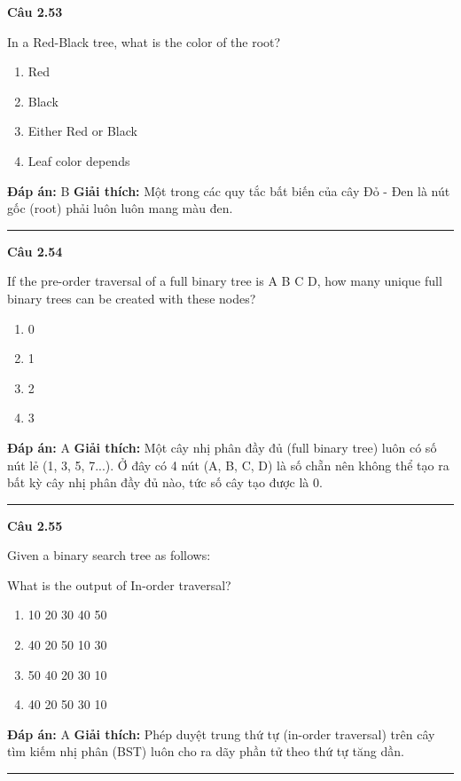 \documentclass[11pt,a4paper]{article}
\newenvironment{question}[1]{%
  \par\vspace{1em}\noindent\textbf{\large Câu #1}\par\vspace{0.4em}
}{%
  \par\vspace{1em}\hrule\vspace{0.6em}
}
\newenvironment{choices}{%
  \begin{enumerate}[label=\textbf{\Alph*.},leftmargin=2.2em,itemsep=2pt,topsep=3pt]
}{%
  \end{enumerate}
}
\newcommand{\choice}{\item}
\begin{document}
\begin{question}{2.53}
In a Red-Black tree, what is the color of the root?
\begin{choices}
\choice Red
\choice Black
\choice Either Red or Black
\choice Leaf color depends
\end{choices}
\textbf{Đáp án:} B
\textbf{Giải thích:} Một trong các quy tắc bất biến của cây Đỏ - Đen là nút gốc (root) phải luôn luôn mang màu đen.
\end{question}

\begin{question}{2.54}
If the pre-order traversal of a full binary tree is A B C D, how many unique full binary trees can be created with these nodes?
\begin{choices}
\choice 0
\choice 1
\choice 2
\choice 3
\end{choices}
\textbf{Đáp án:} A
\textbf{Giải thích:} Một cây nhị phân đầy đủ (full binary tree) luôn có số nút lẻ (1, 3, 5, 7...). Ở đây có 4 nút (A, B, C, D) là số chẵn nên không thể tạo ra bất kỳ cây nhị phân đầy đủ nào, tức số cây tạo được là 0.
\end{question}

\begin{question}{2.55}
Given a binary search tree as follows:

What is the output of In-order traversal?
\begin{center}
\end{center}
\begin{choices}
\choice 10 20 30 40 50
\choice 40 20 50 10 30
\choice 50 40 20 30 10
\choice 40 20 50 30 10
\end{choices}
\textbf{Đáp án:} A
\textbf{Giải thích:} Phép duyệt trung thứ tự (in-order traversal) trên cây tìm kiếm nhị phân (BST) luôn cho ra dãy phần tử theo thứ tự tăng dần.
\end{question}
\end{document}
